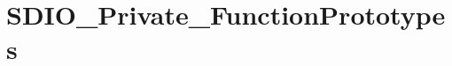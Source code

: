 \hypertarget{group___s_d_i_o___private___function_prototypes}{}\section{S\+D\+I\+O\+\_\+\+Private\+\_\+\+Function\+Prototypes}
\label{group___s_d_i_o___private___function_prototypes}
